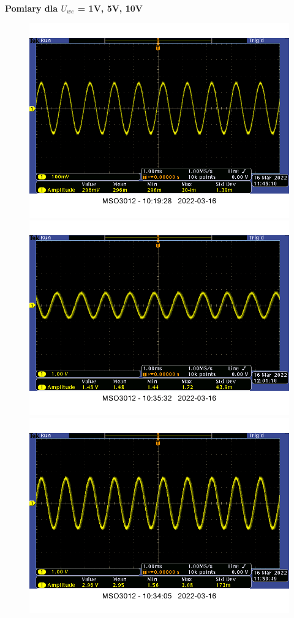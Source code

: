\pagebreak

\begin{center}
    \textbf{Pomiary dla $U_{we}$ = 1V, 5V, 10V}
\end{center}
\begin{figure}[h]
    \centering
    \includegraphics[scale=0.34]{images/1_7-dzielnik_1V.png}
    \includegraphics[scale=0.34]{images/1_7-dzielnik_5V.png}
    \includegraphics[scale=0.34]{images/1_7-dzielnik_10V.png}
    \label{fig:pomiary_dzielnika}
\end{figure}

